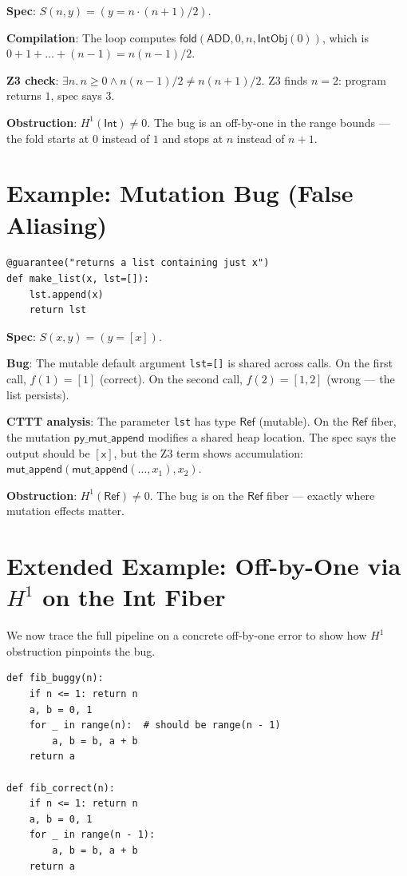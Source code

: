\documentclass[11pt,a4paper]{report}
\theoremstyle{definition}
\theoremstyle{plain}
\newcommand{\fold}{\mathsf{fold}}
\newcommand{\Hone}{H^1}
\begin{document}
\textbf{Spec}: $S(n, y) = (y = n \cdot (n+1) / 2)$.

\textbf{Compilation}: The loop computes $\fold(\mathsf{ADD}, 0, n,
\mathsf{IntObj}(0))$, which is $0 + 1 + \ldots + (n-1) =
n(n-1)/2$.

\textbf{Z3 check}: $\exists n.\, n \geq 0 \land n(n-1)/2 \neq
n(n+1)/2$.  Z3 finds $n = 2$: program returns $1$, spec says $3$.

\textbf{Obstruction}: $\Hone(\mathsf{Int}) \neq 0$.  The bug is
an off-by-one in the range bounds --- the fold starts at $0$
instead of $1$ and stops at $n$ instead of $n+1$.

\section{Example: Mutation Bug (False Aliasing)}

\begin{lstlisting}[caption={Mutable default argument}]
@guarantee("returns a list containing just x")
def make_list(x, lst=[]):
    lst.append(x)
    return lst
\end{lstlisting}

\textbf{Spec}: $S(x, y) = (y = [x])$.

\textbf{Bug}: The mutable default argument \texttt{lst=[]} is shared
across calls.  On the first call, $f(1) = [1]$ (correct).  On the
second call, $f(2) = [1, 2]$ (wrong --- the list persists).

\textbf{CTTT analysis}: The parameter \texttt{lst} has type
$\mathsf{Ref}$ (mutable).  On the $\mathsf{Ref}$ fiber, the
mutation $\mathsf{py\_mut\_append}$ modifies a shared heap location.
The spec says the output should be $[\mathsf{x}]$, but the Z3 term
shows accumulation: $\mathsf{mut\_append}(\mathsf{mut\_append}(\ldots,
x_1), x_2)$.

\textbf{Obstruction}: $\Hone(\mathsf{Ref}) \neq 0$.  The bug is on
the $\mathsf{Ref}$ fiber --- exactly where mutation effects matter.

\section{Extended Example: Off-by-One via $\Hone$ on the Int Fiber}

We now trace the full pipeline on a concrete off-by-one error to
show how $\Hone$ obstruction pinpoints the bug.

\begin{lstlisting}[caption={Fibonacci with off-by-one: detailed trace}]
def fib_buggy(n):
    if n <= 1: return n
    a, b = 0, 1
    for _ in range(n):  # should be range(n - 1)
        a, b = b, a + b
    return a

def fib_correct(n):
    if n <= 1: return n
    a, b = 0, 1
    for _ in range(n - 1):
        a, b = b, a + b
    return a
\end{lstlisting}
\end{document}
